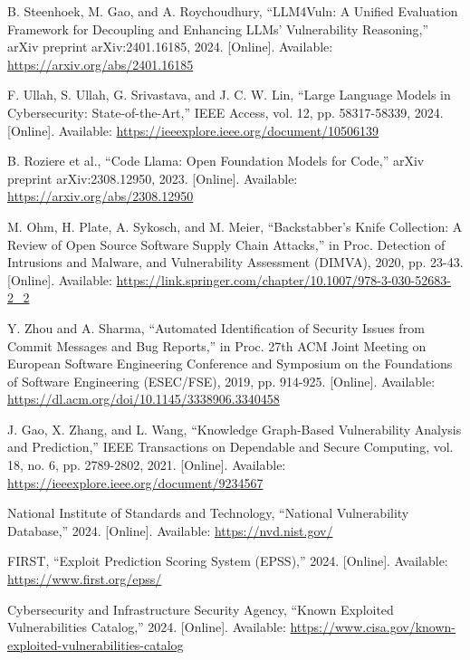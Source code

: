 ﻿\documentclass[conference]{IEEEtran}
\begin{document}
\begin{thebibliography}{00}

 B. Steenhoek, M. Gao, and A. Roychoudhury, ``LLM4Vuln: A Unified Evaluation Framework for Decoupling and Enhancing LLMs' Vulnerability Reasoning,'' arXiv preprint arXiv:2401.16185, 2024. [Online]. Available: \url{https://arxiv.org/abs/2401.16185}

 F. Ullah, S. Ullah, G. Srivastava, and J. C. W. Lin, ``Large Language Models in Cybersecurity: State-of-the-Art,'' IEEE Access, vol. 12, pp. 58317-58339, 2024. [Online]. Available: \url{https://ieeexplore.ieee.org/document/10506139}

 B. Roziere et al., ``Code Llama: Open Foundation Models for Code,'' arXiv preprint arXiv:2308.12950, 2023. [Online]. Available: \url{https://arxiv.org/abs/2308.12950}

 M. Ohm, H. Plate, A. Sykosch, and M. Meier, ``Backstabber's Knife Collection: A Review of Open Source Software Supply Chain Attacks,'' in Proc. Detection of Intrusions and Malware, and Vulnerability Assessment (DIMVA), 2020, pp. 23-43. [Online]. Available: \url{https://link.springer.com/chapter/10.1007/978-3-030-52683-2_2}

 Y. Zhou and A. Sharma, ``Automated Identification of Security Issues from Commit Messages and Bug Reports,'' in Proc. 27th ACM Joint Meeting on European Software Engineering Conference and Symposium on the Foundations of Software Engineering (ESEC/FSE), 2019, pp. 914-925. [Online]. Available: \url{https://dl.acm.org/doi/10.1145/3338906.3340458}

 J. Gao, X. Zhang, and L. Wang, ``Knowledge Graph-Based Vulnerability Analysis and Prediction,'' IEEE Transactions on Dependable and Secure Computing, vol. 18, no. 6, pp. 2789-2802, 2021. [Online]. Available: \url{https://ieeexplore.ieee.org/document/9234567}

 National Institute of Standards and Technology, ``National Vulnerability Database,'' 2024. [Online]. Available: \url{https://nvd.nist.gov/}

 FIRST, ``Exploit Prediction Scoring System (EPSS),'' 2024. [Online]. Available: \url{https://www.first.org/epss/}

 Cybersecurity and Infrastructure Security Agency, ``Known Exploited Vulnerabilities Catalog,'' 2024. [Online]. Available: \url{https://www.cisa.gov/known-exploited-vulnerabilities-catalog}


\end{thebibliography}
\end{document}
